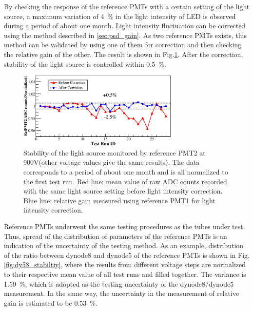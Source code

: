 \documentclass[review, times]{elsarticle}
\begin{document}
By checking the response of the reference PMTs with a certain setting of the light source, a maximum variation of \SI{4}{\percent} in the light intensity of LED is observed during a period of about one month.
Light intensity fluctuation can be corrected using the method described in \ref{sec:psd_gain}.
As two reference PMTs exists, this method can be validated by using one of them for correction and then checking the relative gain of the other. 
The result is shown in Fig.\ref{fig:led_stability}.
After the correction, stability of the light source is controlled within \textpm\SI{0.5}{\percent}.

\begin{figure}
 \centering
 \includegraphics[width=80mm]{led_stability}
\caption{Stability of the light source monitored by reference PMT2 at 900V(other voltage values give the same results).
The data corresponds to a period of about one month and is all normalized to the first test run.
Red line: mean value of raw ADC counts recorded with the same light source setting before light intensity correction.
Blue line: relative gain measured using reference PMT1 for light intensity correction.}
\label{fig:led_stability}
\end{figure} 

Reference PMTs underwent the same testing procedures as the tubes under test.
Thus, spread of the distribution of parameters of the reference PMTs is an indication of the uncertainty of the testing method.
As an example, distribution of the ratio between dynode8 and dynode5 of the reference PMTs is shown in Fig.\ref{fig:dy58_stabiltiy}, where the results from different voltage steps are normalized to their respective mean value of all test runs and filled together.
The variance is \SI{1.59}{\percent}, which is adopted as the testing uncertainty of the dynode8/dynode5 measurement.
In the same way, the uncertainty in the measurement of relative gain is estimated to be \SI{0.53}{\percent}. 
\end{document}

